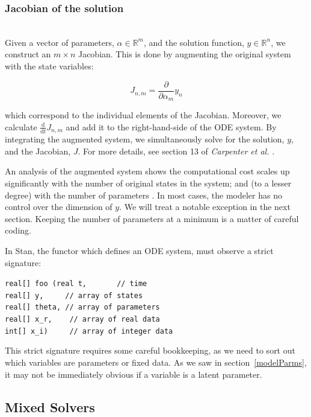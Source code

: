 \documentclass[11pt]{amsart}
\begin{document}
\subsubsection{Jacobian of the solution} \ \\

Given a vector of parameters, $\alpha \in \mathbb{R}^m$, and the solution function, 
$y \in \mathbb{R}^n$, we construct an $m \times n$ Jacobian. This is done by augmenting the 
original system with the state variables:

$$
J_{n, m} = \frac{\partial}{\partial \alpha_m}y_n
$$  

which correspond to the individual elements of the Jacobian. Moreover, we calculate 
$\frac{\mathrm{d}}{\mathrm{d}t}J_{n, m}$ and add it to the right-hand-side of the ODE system. By 
integrating the augmented system, we simultaneously solve for the solution, $y$, and the 
Jacobian, $J$. For more details, see section 13 of \textit{Carpenter et al.} \cite{Carpenter:2015}.

An analysis of the augmented system shows the computational cost scales up significantly 
with the number of original states in the system; and (to a lesser degree) with the number 
of parameters \cite{Margossian:2017b}. In most cases, the modeler has no control over the dimension 
of $y$. We will treat a notable exception in the next section. Keeping the number of parameters
 at a minimum is a matter of careful coding.

In Stan, the functor which defines an ODE system, must observe a strict signature:

\texttt{real[] foo (real t,  {\ \ \ \ \ \ \color{gray}// time} \\
\phantom{real[] foo (}real[] y, {\ \ \ \ \color{gray}// array of states} \\
\phantom{real[] foo (}real[] theta, {\color{gray}// array of parameters} \\
\phantom{real[] foo (}real[] x\_r, {\ \  \color{gray} // array of real data} \\
\phantom{real[] foo (}int[] x\_i) {\ \ \ \color{gray} // array of integer data}
                   }

This strict signature requires some careful bookkeeping, as we need to sort out which 
variables are parameters or fixed data. As we saw in section~\ref{modelParms}, it
may not be immediately obvious if a variable is a latent parameter.

\pagebreak

\subsection{Mixed Solvers} \ \\
\end{document}
